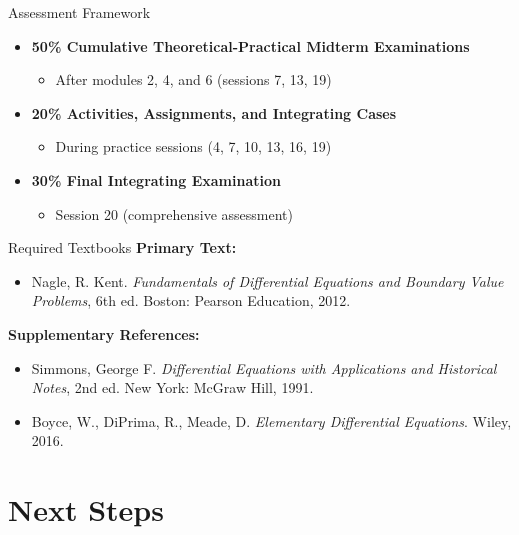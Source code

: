\documentclass[10pt,aspectratio=169]{beamer}
\begin{document}
\begin{frame}{Assessment Framework}
    \begin{itemize}
        \item \textbf{50\% Cumulative Theoretical-Practical Midterm Examinations}
        \begin{itemize}
            \item After modules 2, 4, and 6 (sessions 7, 13, 19)
        \end{itemize}
        
        \item \textbf{20\% Activities, Assignments, and Integrating Cases}
        \begin{itemize}
            \item During practice sessions (4, 7, 10, 13, 16, 19)
        \end{itemize}
        
        \item \textbf{30\% Final Integrating Examination}
        \begin{itemize}
            \item Session 20 (comprehensive assessment)
        \end{itemize}
    \end{itemize}
\end{frame}

\begin{frame}{Required Textbooks}
    \textbf{Primary Text:}
    \begin{itemize}
        \item Nagle, R. Kent. \textit{Fundamentals of Differential Equations and Boundary Value Problems}, 6th ed. Boston: Pearson Education, 2012.
    \end{itemize}
    
    \textbf{Supplementary References:}
    \begin{itemize}
        \item Simmons, George F. \textit{Differential Equations with Applications and Historical Notes}, 2nd ed. New York: McGraw Hill, 1991.
        \item Boyce, W., DiPrima, R., Meade, D. \textit{Elementary Differential Equations}. Wiley, 2016.
    \end{itemize}
\end{frame}

\section{Next Steps}
\end{document}

